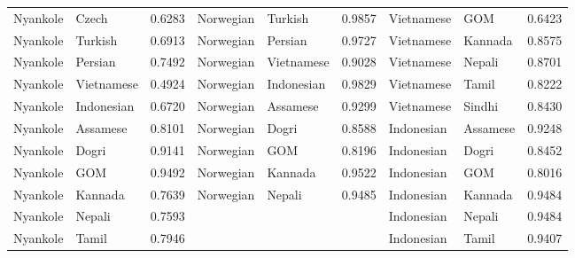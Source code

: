 \documentclass[11pt]{article} %
\begin{document}
\begin{table}
\begin{tabular}{llr@{\hspace{12pt}}llr@{\hspace{12pt}}llr}
            Nyankole                     & Czech               & 0.6283        & Norwegian           & Turkish             & 0.9857        & Vietnamese          & GOM                 & 0.6423        \\
            Nyankole                     & Turkish             & 0.6913        & Norwegian           & Persian             & 0.9727        & Vietnamese          & Kannada             & 0.8575        \\
            Nyankole                     & Persian             & 0.7492        & Norwegian           & Vietnamese          & 0.9028        & Vietnamese          & Nepali              & 0.8701        \\
            Nyankole                     & Vietnamese          & 0.4924        & Norwegian           & Indonesian          & 0.9829        & Vietnamese          & Tamil               & 0.8222        \\
            Nyankole                     & Indonesian          & 0.6720        & Norwegian           & Assamese            & 0.9299        & Vietnamese          & Sindhi              & 0.8430        \\
            Nyankole                     & Assamese            & 0.8101        & Norwegian           & Dogri               & 0.8588        & Indonesian          & Assamese            & 0.9248        \\
            Nyankole                     & Dogri               & 0.9141        & Norwegian           & GOM                 & 0.8196        & Indonesian          & Dogri               & 0.8452        \\
            Nyankole                     & GOM                 & 0.9492        & Norwegian           & Kannada             & 0.9522        & Indonesian          & GOM                 & 0.8016        \\
            Nyankole                     & Kannada             & 0.7639        & Norwegian           & Nepali              & 0.9485        & Indonesian          & Kannada             & 0.9484        \\
            Nyankole                     & Nepali              & 0.7593        &                     &                     &               & Indonesian          & Nepali              & 0.9484        \\
            Nyankole                     & Tamil               & 0.7946        &                     &                     &               & Indonesian          & Tamil               & 0.9407        \\

\end{tabular}
\end{table}
\end{document}
